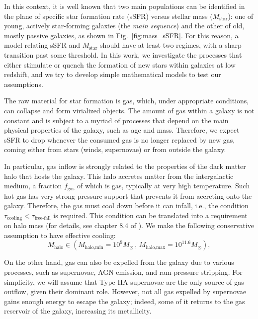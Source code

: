 \documentclass[fleqn,usenatbib]{mnras}
\begin{document}
In this context, it is well known \citep[e.g.,][]{Kauffmann_2003} that two main populations can be identified in the plane of specific star formation rate (sSFR) versus stellar mass ($M_{\text{star}}$): one of young, actively star-forming galaxies (the \textit{main sequence}) and the other of old, mostly passive galaxies, as shown in Fig.~\ref{fig:mass_sSFR}. For this reason, a model relating sSFR and $M_{\text{star}}$ should have at least two regimes, with a sharp transition past some threshold. In this work, we investigate the processes that either stimulate or quench the formation of new stars within galaxies at low redshift, and we try to develop simple mathematical models to test our assumptions.

The raw material for star formation is gas, which, under appropriate conditions, can collapse and form virialized objects. The amount of gas within a galaxy is not constant and is subject to a myriad of processes that depend on the main physical properties of the galaxy, such as age and mass. Therefore, we expect sSFR to drop whenever the consumed gas is no longer replaced by new gas, coming either from stars (winds, supernovae) or from outside the galaxy. 

In particular, gas inflow is strongly related to the properties of the dark matter halo that hosts the galaxy. This halo accretes matter from the intergalactic medium, a fraction $f_{\text{gas}}$ of which is gas, typically at very high temperature. Such hot gas has very strong pressure support that prevents it from accreting onto the galaxy. Therefore, the gas must cool down before it can infall, i.e., the condition $\tau_{\text{cooling}} < \tau_{\text{free-fall}}$ is required. This condition can be translated into a requirement on halo mass (for details, see chapter 8.4 of \citet{galaxy_formation_and_evolution_2010}). We make the following conservative assumption to have effective cooling:
\begin{equation}
    M_{\text{halo}} \in \left( M_{\text{halo,min}}=10^9 M_\odot \, , \, M_{\text{halo,max}}=10^{11.6} M_\odot \right),
	\label{eq:halo_mass_minmax}
\end{equation}

On the other hand, gas can also be expelled from the galaxy due to various processes, such as supernovae, AGN emission, and ram-pressure stripping. For simplicity, we will assume that Type IIA supernovae are the only source of gas outflow, given their dominant role. However, not all gas expelled by supernovae gains enough energy to escape the galaxy; indeed, some of it returns to the gas reservoir of the galaxy, increasing its metallicity. 
\end{document}
